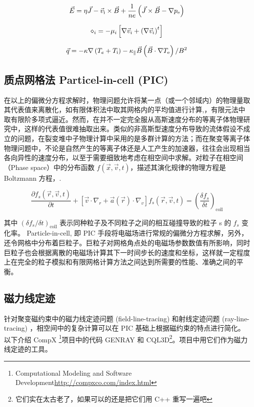 \begin{equation}\vec{E}=\eta \vec{J}-\vec{v}_{\mathrm{i}} \times \vec{B}+\frac{1}{n e}\left(\vec{J} \times \vec{B}-\nabla p_{\mathrm{e}}\right)\end{equation}

\begin{equation}\mathcal{\Pi}_{i}=-\mu_{i}\left[\nabla \vec{v}_{i}+\left(\nabla \vec{v}_{i}\right)^{t}\right]\end{equation}

\begin{equation}\vec{q}=-\kappa \nabla\left(T_{e}+T_{\mathrm{i}}\right)-\kappa_{\|} \vec{B}\left(\vec{B} \cdot \nabla T_{\mathrm{e}}\right) / B^{2}\end{equation}

\subsection{质点网格法 Particel-in-cell (PIC)}

在以上的偏微分方程求解时，物理问题允许将某一点（或一个邻域内）的物理量取其代表值来离散化，如有限体积法中取其网格内的平均值进行计算,，有限元法中取有限阶多项式逼近。然而，在并不一定完全服从高斯速度分布的等离子体物理研究中，这样的代表值很难抽取出来。类似的非高斯型速度分布导致的流体假设不成立的问题，在裂变堆中子物理计算中采用的是多群计算的方法；而在聚变等离子体物理问题中，不论是自然产生的等离子体还是人工产生的加速器，往往会出现相当各向异性的速度分布，以至于需要细致地考虑在相空间中求解。对粒子在相空间（Phase space）中的分布函数 $f(\vec{x},\vec{v},t)$，描述其演化规律的物理方程是 Boltzmann 方程，\cite{ColonnaBoltamann10.1088/978-0-7503-1200-4ch1}.

\begin{equation}
\label{eq:Boltzmann}
\frac{\partial f_{s}(\vec{r}, \vec{v}, t)}{\partial t}+\left[\vec{v} \cdot \nabla_{r}+\vec{a}(\vec{r}) \cdot \nabla_{v}\right] f_{s}(\vec{r}, \vec{v}, t)=\left(\frac{\delta f_{s}}{\delta t}\right)_{\mathrm{coll}}
\end{equation}

其中 $(\delta f_{s}/\delta t )_{\mathrm{coll}}$ 表示同种粒子及不同粒子之间的相互碰撞导致的粒子 s 的 $f_s$ 变化率。
Particle-in-cell, 即 PIC 手段将电磁场进行常规的偏微分方程求解，另外，还令网格中分布着巨粒子。巨粒子对网格角点处的电磁场参数数值有所影响，同时巨粒子也会根据离散的电磁场计算其下一时间步长的速度和坐标，这样就一定程度上在完全的粒子模拟和有限网格计算方法之间达到所需要的性能、准确之间的平衡。

\subsection{磁力线定迹}
针对聚变磁约束中的磁力线定迹问题 (field-line-tracing) 和射线定迹问题 (ray-line-tracing) ，相空间中的复杂计算可以在 PIC 基础上根据磁约束的特点进行简化。以下介绍 CompX \footnote{
Computational Modeling and Software Development\url{http://compxco.com/index.html}}项目中的代码 GENRAY 和 CQL3D\footnote{它们实在太古老了，如果可以的还是把它们用 C++ 重写一遍吧}。项目中用它们作为磁力线定迹的工具。

